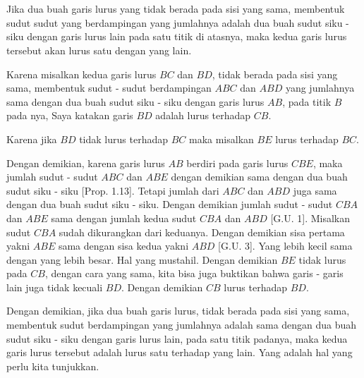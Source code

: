 \documentclass[a4paper]{book}
\begin{document}
\section*{\centering \thesection} 

Jika dua buah garis lurus yang tidak berada pada sisi yang sama, membentuk
sudut sudut yang berdampingan yang jumlahnya adalah dua buah sudut siku - siku
dengan garis lurus lain pada satu titik di atasnya, maka kedua garis lurus tersebut 
akan lurus satu dengan yang lain.

\begin{center}
\end{center}

Karena misalkan kedua garis lurus $BC$ dan $BD$, tidak berada pada sisi yang sama,
membentuk sudut - sudut berdampingan $ABC$ dan $ABD$ yang jumlahnya sama dengan
dua buah sudut siku - siku dengan garis lurus $AB$, pada titik $B$ pada nya, Saya
katakan garis $BD$ adalah lurus terhadap $CB$.

Karena jika $BD$ tidak lurus terhadap $BC$ maka misalkan $BE$ lurus
terhadap $BC$. 

Dengan demikian, karena garis lurus $AB$ berdiri pada garis lurus $CBE$, maka 
jumlah sudut - sudut $ABC$ dan $ABE$ dengan demikian sama dengan dua buah 
sudut siku - siku [Prop. 1.13]. Tetapi jumlah dari $ABC$ dan $ABD$ juga sama
dengan dua buah sudut siku - siku. Dengan demikian jumlah sudut - sudut $CBA$
dan $ABE$ sama dengan jumlah kedua sudut $CBA$ dan $ABD$ [G.U. 1]. Misalkan 
sudut $CBA$ sudah dikurangkan dari keduanya. Dengan demikian sisa pertama 
yakni $ABE$ sama dengan sisa kedua yakni $ABD$
 [G.U. 3]. Yang lebih kecil sama
dengan yang lebih besar. Hal yang mustahil. Dengan demikian $BE$ tidak lurus pada
$CB$, dengan cara yang sama, kita bisa juga buktikan bahwa garis - garis lain
juga tidak kecuali $BD$. Dengan demikian $CB$ lurus terhadap $BD$.

Dengan demikian, jika dua buah garis lurus, tidak berada pada sisi yang sama, 
membentuk sudut berdampingan yang jumlahnya adalah sama dengan dua buah sudut
siku - siku dengan garis lurus lain, pada satu titik padanya, maka kedua
garis lurus tersebut adalah lurus satu terhadap yang lain. Yang adalah hal yang
perlu kita tunjukkan.  
\end{document}
